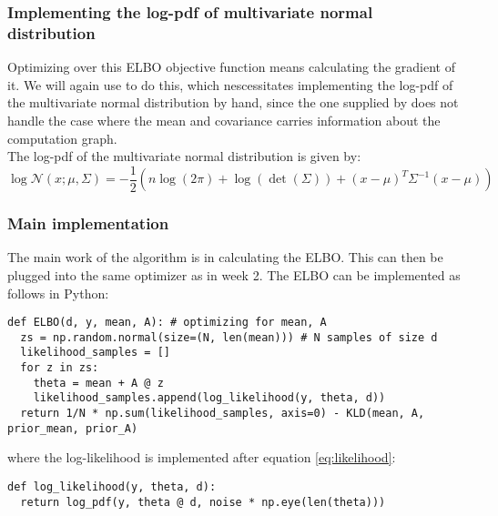 \subsubsection{Implementing the log-pdf of multivariate normal distribution}
Optimizing over this ELBO objective function means calculating the gradient of it. 
We will again use  to do this, which nescessitates implementing the log-pdf of the multivariate normal distribution by hand, 
since the one supplied by  does not handle the case where the mean and covariance carries information about the computation graph.\\
The log-pdf of the multivariate normal distribution is given by:
\begin{equation}
  \log \mathcal{N}(x; \mu, \Sigma) = -\frac{1}{2}(n\log(2\pi) + \log(\det(\Sigma)) + (x - \mu)^T\Sigma^{-1}(x - \mu))
\end{equation}

\subsubsection{Main implementation}
The main work of the algorithm is in calculating the ELBO. This can then be plugged into the same optimizer as in week 2.
The ELBO can be implemented as follows in Python:
\begin{verbatim}
def ELBO(d, y, mean, A): # optimizing for mean, A
  zs = np.random.normal(size=(N, len(mean))) # N samples of size d
  likelihood_samples = []
  for z in zs:
    theta = mean + A @ z
    likelihood_samples.append(log_likelihood(y, theta, d))
  return 1/N * np.sum(likelihood_samples, axis=0) - KLD(mean, A, prior_mean, prior_A)
\end{verbatim}
where the log-likelihood is implemented after equation \ref{eq:likelihood}:
\begin{verbatim}
def log_likelihood(y, theta, d):
  return log_pdf(y, theta @ d, noise * np.eye(len(theta)))
\end{verbatim}
